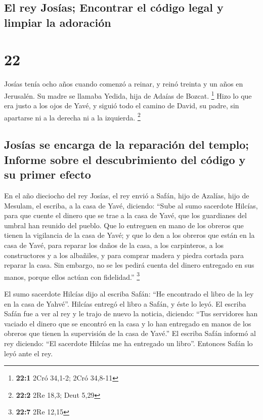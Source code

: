 \hypertarget{el-rey-josuxedas-encontrar-el-cuxf3digo-legal-y-limpiar-la-adoraciuxf3n}{%
\subsection{El rey Josías; Encontrar el código legal y limpiar la
adoración}\label{el-rey-josuxedas-encontrar-el-cuxf3digo-legal-y-limpiar-la-adoraciuxf3n}}

\hypertarget{section-21}{%
\section{22}\label{section-21}}

 Josías tenía ocho años cuando comenzó a reinar, y reinó
treinta y un años en Jerusalén. Su madre se llamaba Yedida, hija de
Adaías de Bozcat. \footnote{\textbf{22:1} 2Cró 34,1-2; 2Cró 34,8-11}
 Hizo lo que era justo a los ojos de Yavé, y siguió todo
el camino de David, su padre, sin apartarse ni a la derecha ni a la
izquierda. \footnote{\textbf{22:2} 2Re 18,3; Deut 5,29}

\hypertarget{josuxedas-se-encarga-de-la-reparaciuxf3n-del-templo-informe-sobre-el-descubrimiento-del-cuxf3digo-y-su-primer-efecto}{%
\subsection{Josías se encarga de la reparación del templo; Informe sobre
el descubrimiento del código y su primer
efecto}\label{josuxedas-se-encarga-de-la-reparaciuxf3n-del-templo-informe-sobre-el-descubrimiento-del-cuxf3digo-y-su-primer-efecto}}

 En el año dieciocho del rey Josías, el rey envió a Safán,
hijo de Azalías, hijo de Mesulam, el escriba, a la casa de Yavé,
diciendo:  ``Sube al sumo sacerdote Hilcías, para que
cuente el dinero que se trae a la casa de Yavé, que los guardianes del
umbral han reunido del pueblo.  Que lo entreguen en mano
de los obreros que tienen la vigilancia de la casa de Yavé; y que lo den
a los obreros que están en la casa de Yavé, para reparar los daños de la
casa,  a los carpinteros, a los constructores y a los
albañiles, y para comprar madera y piedra cortada para reparar la casa.
 Sin embargo, no se les pedirá cuenta del dinero entregado
en sus manos, porque ellos actúan con fidelidad.'' \footnote{\textbf{22:7}
  2Re 12,15}

 El sumo sacerdote Hilcías dijo al escriba Safán: ``He
encontrado el libro de la ley en la casa de Yahvé''. Hilcías entregó el
libro a Safán, y éste lo leyó.  El escriba Safán fue a ver
al rey y le trajo de nuevo la noticia, diciendo: ``Tus servidores han
vaciado el dinero que se encontró en la casa y lo han entregado en manos
de los obreros que tienen la supervisión de la casa de Yavé.''
 El escriba Safán informó al rey diciendo: ``El sacerdote
Hilcías me ha entregado un libro''. Entonces Safán lo leyó ante el rey.

